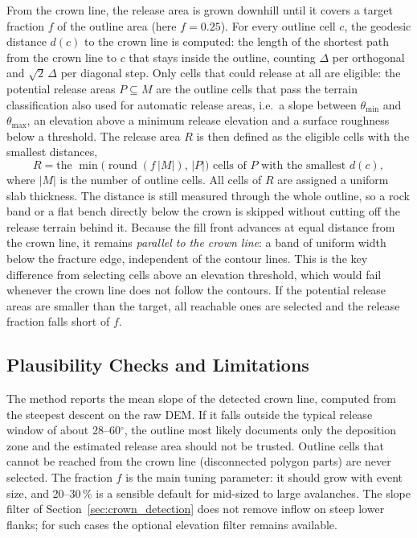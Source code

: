 From the crown line, the release area is grown downhill until it covers a
target fraction $f$ of the outline area (here $f = 0.25$). For every outline
cell $c$, the geodesic distance $d(c)$ to the crown line is computed: the
length of the shortest path from the crown line to $c$ that stays inside the
outline, counting $\Delta$ per orthogonal and $\sqrt{2}\,\Delta$ per diagonal
step. Only cells that could release at all are eligible: the potential
release areas $P \subseteq M$ are the outline cells that pass the
terrain classification also used for automatic release areas, i.e.\ a slope
between $\theta_{\min}$ and $\theta_{\max}$, an elevation above a minimum
release elevation and a surface roughness below a threshold. The release area
$R$ is then defined as the eligible cells with the smallest distances,
\begin{equation}
  R = \text{the } \min\!\big(\operatorname{round}(f \, |M|),\, |P|\big)
      \text{ cells of } P \text{ with the smallest } d(c),
  \label{eq:fill}
\end{equation}
where $|M|$ is the number of outline cells. All cells of $R$ are assigned a
uniform slab thickness. The distance is still measured through the whole
outline, so a rock band or a flat bench directly below the crown is skipped
without cutting off the release terrain behind it. Because the fill front
advances at equal distance from the crown line, it remains \emph{parallel to
the crown line}: a band of uniform width below the fracture edge, independent
of the contour lines. This is the key difference from selecting cells above an
elevation threshold, which would fail whenever the crown line does not follow
the contours. If the potential release areas are smaller than the target, all
reachable ones are selected and the release fraction falls short of $f$.

\subsection{Plausibility Checks and Limitations}
\label{sec:release_checks}

The method reports the mean slope of the detected crown line, computed from the
steepest descent on the raw DEM. If it falls outside the typical release
window of about 28--60$^\circ$, the outline most likely documents only the
deposition zone and the estimated release area should not be trusted. Outline
cells that cannot be reached from the crown line (disconnected polygon parts)
are never selected. The fraction $f$ is the main tuning parameter: it should
grow with event size, and 20--30\,\% is a sensible default for mid-sized to
large avalanches. The slope filter of Section~\ref{sec:crown_detection} does
not remove inflow on steep lower flanks; for such cases the optional elevation
filter remains available.
